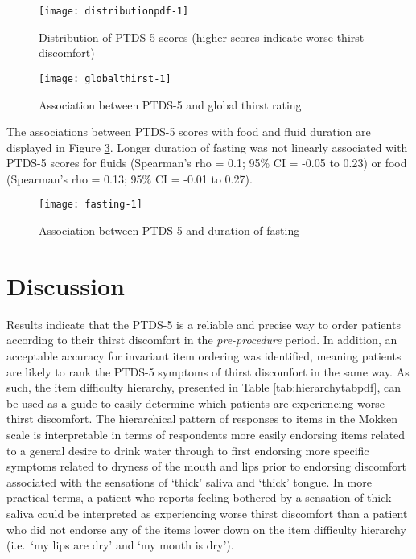 \documentclass[12pt,twoside,]{pinp}
\begin{document}
\begin{figure}

{\centering \texttt{[image: distributionpdf-1]}

}

\caption{Distribution of PTDS-5 scores (higher scores indicate worse thirst discomfort)}\label{fig:distributionpdf}
\end{figure}

\begin{figure}

{\centering \texttt{[image: globalthirst-1]}

}

\caption{Association between PTDS-5 and global thirst rating}\label{fig:globalthirst}
\end{figure}

The associations between PTDS-5 scores with food and fluid duration are
displayed in Figure \ref{fig:fasting}. Longer duration of fasting was
not linearly associated with PTDS-5 scores for fluids (Spearman's rho =
0.1; 95\% CI = -0.05 to 0.23) or food (Spearman's rho = 0.13; 95\% CI =
-0.01 to 0.27).

\begin{figure}

{\centering \texttt{[image: fasting-1]}

}

\caption{Association between PTDS-5 and duration of fasting}\label{fig:fasting}
\end{figure}

\hypertarget{discussion}{%
\section{Discussion}\label{discussion}}

Results indicate that the PTDS-5 is a reliable and precise way to order
patients according to their thirst discomfort in the
\emph{pre-procedure} period. In addition, an acceptable accuracy for
invariant item ordering was identified, meaning patients are likely to
rank the PTDS-5 symptoms of thirst discomfort in the same way. As such,
the item difficulty hierarchy, presented in Table
\ref{tab:hierarchytabpdf}, can be used as a guide to easily determine
which patients are experiencing worse thirst discomfort. The
hierarchical pattern of responses to items in the Mokken scale is
interpretable in terms of respondents more easily endorsing items
related to a general desire to drink water through to first endorsing
more specific symptoms related to dryness of the mouth and lips prior to
endorsing discomfort associated with the sensations of `thick' saliva
and `thick' tongue. In more practical terms, a patient who reports feeling bothered by a sensation of thick saliva could be interpreted as experiencing worse thirst discomfort than a patient who did not endorse any of the items lower down on the item difficulty hierarchy (i.e.~`my lips are dry' and `my mouth is dry').
\end{document}
